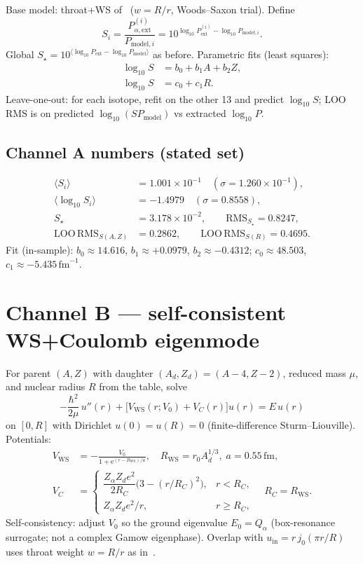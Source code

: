 \documentclass[11pt,a4paper]{article}
\theoremstyle{remark}
\newcommand{\ee}{\mathrm{e}}
\begin{document}
Base model: throat+WS of~\cite{PalphaThroat2026}
($w=R/r$, Woods--Saxon trial).  Define
\begin{equation}
S_i=\frac{P_{\alpha,\mathrm{ext}}^{(i)}}{P_{\mathrm{model},i}}
=10^{\log_{10}P_{\mathrm{ext}}^{(i)}-\log_{10}P_{\mathrm{model},i}}.
\end{equation}
Global $S_\star=10^{\langle\log_{10}P_{\mathrm{ext}}-\log_{10}P_{\mathrm{model}}\rangle}$
as before.  Parametric fits (least squares):
\begin{align}
\log_{10}S &= b_0 + b_1 A + b_2 Z,\\
\log_{10}S &= c_0 + c_1 R.
\end{align}
Leave-one-out: for each isotope, refit on the other 13 and predict
$\log_{10}S$; LOO RMS is on predicted $\log_{10}(S P_{\mathrm{model}})$ vs
extracted $\log_{10}P$.

\subsection{Channel A numbers (stated set)}
\begin{align*}
\langle S_i\rangle &= 1.001\times 10^{-1}
\quad(\sigma=1.260\times 10^{-1}),\\
\langle\log_{10}S_i\rangle &= -1.4979
\quad(\sigma=0.8558),\\
S_\star &= 3.178\times 10^{-2},\qquad
\mathrm{RMS}_{S_\star}=0.8247,\\
\mathrm{LOO\,RMS}_{S(A,Z)} &= 0.2862,\qquad
\mathrm{LOO\,RMS}_{S(R)}=0.4695.
\end{align*}
Fit (in-sample):
$b_0\approx 14.616$, $b_1\approx +0.0979$, $b_2\approx -0.4312$;
$c_0\approx 48.503$, $c_1\approx -5.435\,\mathrm{fm}^{-1}$.

\section{Channel B --- self-consistent WS+Coulomb eigenmode}

For parent $(A,Z)$ with daughter $(A_d,Z_d)=(A-4,Z-2)$, reduced mass
$\mu$, and nuclear radius $R$ from the table, solve
\begin{equation}
-\frac{\hbar^2}{2\mu}\,u''(r)
+\bigl[V_{\mathrm{WS}}(r;V_0)+V_C(r)\bigr]u(r)=E\,u(r)
\end{equation}
on $[0,R]$ with Dirichlet $u(0)=u(R)=0$ (finite-difference
Sturm--Liouville).  Potentials:
\begin{align}
V_{\mathrm{WS}}&=-\frac{V_0}{1+\ee^{(r-R_{\mathrm{WS}})/a}},
\quad R_{\mathrm{WS}}=r_0 A_d^{1/3},\; a=0.55\,\mathrm{fm},\\
V_C&=
\begin{cases}
\dfrac{Z_\alpha Z_d e^2}{2 R_C}\bigl(3-(r/R_C)^2\bigr), & r<R_C,\\[0.6em]
Z_\alpha Z_d e^2/r, & r\ge R_C,
\end{cases}
\quad R_C=R_{\mathrm{WS}}.
\end{align}
Self-consistency: adjust $V_0$ so the ground eigenvalue $E_0=Q_\alpha$
(box-resonance surrogate; not a complex Gamow eigenphase).  Overlap with
$u_{\mathrm{in}}=r\,j_0(\pi r/R)$ uses throat weight $w=R/r$ as
in~\cite{PalphaThroat2026}.
\end{document}

